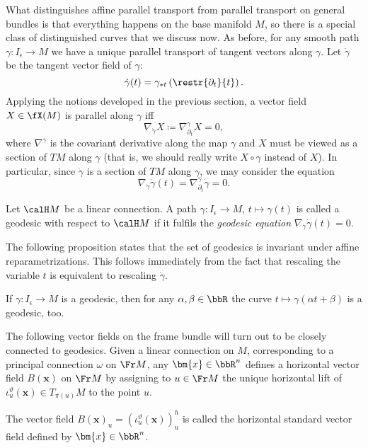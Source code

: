 What distinguishes affine parallel transport from parallel transport on general bundles is that everything happens on the base manifold $M$, so there is a special class of distinguished curves that we discuss now. As before, for any smooth path $\gamma:I_\epsilon\to M$ we have a unique parallel transport of tangent vectors along $\gamma$. Let $\dot\gamma$ be the tangent vector field of $\gamma$:
\[\dot\gamma(t)=\gamma_{\ast t}\left(\restr{\partial_t}{t}\right).\]
Applying the notions developed in the previous section, a vector field $X\in \fX(M)$ is parallel along $\gamma$ iff 
\[\nabla_{\dot\gamma}X\coloneqq \nabla^\gamma_{\partial_t}X=0,\label{eq 2.1.34 RS2}\]
where $\nabla^\gamma$ is the covariant derivative along the map $\gamma$ and $X$ must be viewed as a section of $TM$ along $\gamma$ (that is, we should really write $X\circ\gamma$ instead of $X$). In particular, since $\dot\gamma$ is a section of $TM$ along $\gamma$, we may consider the equation 
\[\nabla_{\dot\gamma}\dot\gamma(t)=\nabla^\gamma_{\partial_t}\dot\gamma=0.\label{eq 2.1.35 RS2}\] 

\begin{defn}[Geodesic]
    Let $\calH M$ be a linear connection. A path $\gamma:I_\epsilon\to M$, $t\mapsto \gamma(t)$ is called a geodesic with respect to $\calH M$ if it fulfils the \emph{geodesic equation} $\nabla_{\dot\gamma}\dot\gamma(t)=0$.
\end{defn}

The following proposition states that the set of geodesics is invariant under affine reparametrizations. This follows immediately from the fact that rescaling the variable $t$ is equivalent to rescaling $\dot\gamma$.
\begin{prop}[{{\cite[Prop.~2.1.21]{RS2}}}]\label{prop 2.1.21 RS2}
    If $\gamma:I_\epsilon\to M$ is a geodesic, then for any $\alpha,\beta\in\bbR$ the curve $t\mapsto \gamma(\alpha t+\beta)$ is a geodesic, too.
\end{prop}


The following vector fields on the frame bundle will turn out to be closely connected to geodesics. Given a linear connection on $M$, corresponding to a principal connection $\omega$ on $\Fr M$, any $\bm{x}\in\bbR^n$ defines a horizontal vector field $B(\bm{x})$ on $\Fr M$ by assigning to $u\in\Fr M$ the unique horizontal lift of $\iota_u^\vartheta(\bm{x})\in T_{\pi(u)}M$ to the point $u$.

\begin{defn}
    The vector field $B(\bm{x})_u=\left(\iota_u^\vartheta(\bm{x})\right)_u^h$ is called the horizontal standard vector field defined by $\bm{x}\in\bbR^n$.
\end{defn}

